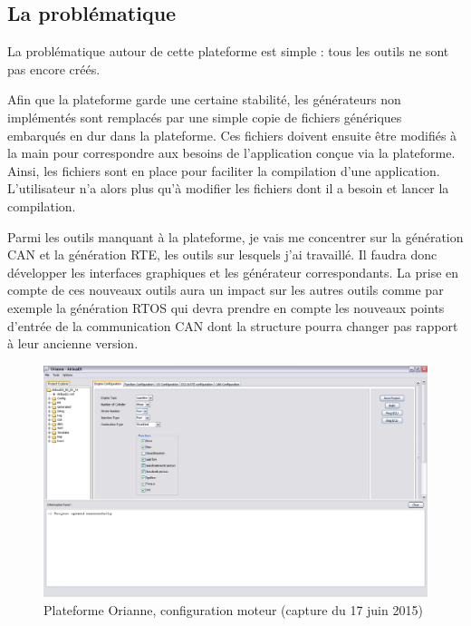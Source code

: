 \subsection{La problématique}
La problématique autour de cette plateforme est simple : tous les outils ne sont
pas encore créés.

Afin que la plateforme garde une certaine stabilité, les générateurs non
implémentés sont remplacés par une simple copie de fichiers génériques embarqués
en dur dans la plateforme. Ces fichiers doivent ensuite être modifiés à la main
pour correspondre aux besoins de l'application conçue via la plateforme. Ainsi,
les fichiers sont en place pour faciliter la compilation d'une application.
L'utilisateur n'a alors plus qu'à modifier les fichiers dont il a besoin et
lancer la compilation.

Parmi les outils manquant à la plateforme, je vais me concentrer sur la
génération CAN et la génération RTE, les outils sur lesquels j'ai travaillé. Il
faudra donc développer les interfaces graphiques et les générateur
correspondants. La prise en compte de ces nouveaux outils aura un impact sur les
autres outils comme par exemple la génération RTOS qui devra prendre en compte
les nouveaux points d'entrée de la communication CAN dont la structure pourra
changer pas rapport à leur ancienne version.

\begin{figure}[h]
  \centering
  \includegraphics[angle=-90, scale=0.5]{images/plateforme}
  \caption{Plateforme Orianne, configuration moteur (capture du 17 juin 2015)}
  \label{fig:plateforme}
\end{figure}

